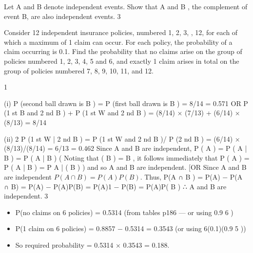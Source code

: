 \documentclass[a4paper,12pt]{article}
\begin{document}

Let A and B denote independent events.
Show that A and B , the complement of event B, are also independent events.
3

Consider 12 independent insurance policies, numbered 1, 2, 3, , 12, for each of which a maximum of 1 claim can occur. For each policy, the probability of a claim occurring is 0.1.
Find the probability that no claims arise on the group of policies numbered 1, 2, 3, 4, 5 and 6, and exactly 1 claim arises in total on the group of policies numbered 7, 8, 9, 10, 11, and 12.

1
\item (i)
P (second ball drawn is B ) = P (first ball drawn is B ) = 8/14 = 0.571
OR P (1 st B and 2 nd B ) + P (1 st W and 2 nd B )
= (8/14) × (7/13) + (6/14) × (8/13) = 8/14
\item (ii)
2
P (1 st W | 2 nd B ) = P (1 st W and 2 nd B )/ P (2 nd B ) = (6/14) × (8/13)/(8/14)
= 6/13 = 0.462
Since A and B are independent, P ( A ) = P ( A | B ) = P ( A | B )
(
Noting that ( B ) = B , it follows immediately that P ( A ) = P ( A | B ) = P A | ( B )
)
and so A and B are independent.
[OR
Since A and B are independent $P (A \cap B) = P(A)P(B)$.
Thus,
P(A ∩ B ) = P(A) − P(A ∩ B) = P(A) − P(A)P(B) = P(A){1 − P(B)} = P(A)P( B )
∴ A and B are independent.
3
\begin{itemize}
\item P(no claims on 6 policies) = 0.5314 (from tables p186 — or using 0.9 6 )
\item P(1 claim on 6 policies) = 0.8857 − 0.5314 = 0.3543 (or using 6(0.1)(0.9 5 ))
\item So required probability = 0.5314 × 0.3543 = 0.188.
\end{itemize}
\end{document}
